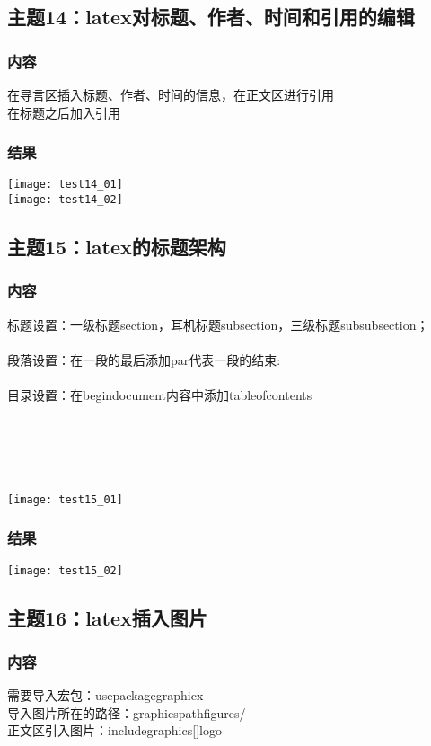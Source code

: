 \documentclass{article}
\begin{document}
\subsection{主题14：latex对标题、作者、时间和引用的编辑}  
\subsubsection{内容}
在导言区插入标题、作者、时间的信息，在正文区进行引用\\
在标题之后加入引用\\
\subsubsection{结果}  
\texttt{[image: test14\_01]}\\
\texttt{[image: test14\_02]}\\
\newpage
\thispagestyle{empty}
\subsection{主题15：latex的标题架构}  
\subsubsection{内容}
标题设置：一级标题section{}，耳机标题subsection{}，三级标题subsubsection{}；\\\\
段落设置：在一段的最后添加par代表一段的结束:\\\\
目录设置：在begin{document}内容中添加tableofcontents\\\\\\\\\\\\
\texttt{[image: test15\_01]}
\subsubsection{结果} 
\texttt{[image: test15\_02]}\\
\vspace{1cm}
\subsection{主题16：latex插入图片} 
\subsubsection{内容}
需要导入宏包：usepackage{graphicx}\\
导入图片所在的路径：graphicspath{{figures/}}%
\\正文区引入图片：includegraphics[]{logo}%
\end{document}
